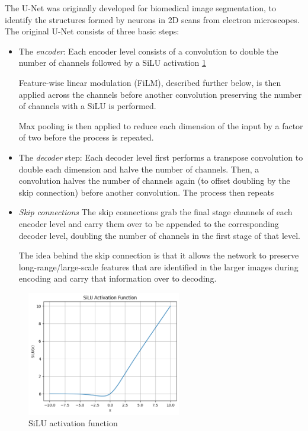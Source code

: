 \documentclass[12pt]{article}
\begin{document}
The U-Net was originally developed for biomedical image segmentation, to identify the structures formed by neurons in 
2D scans from electron microscopes. The original U-Net consists of three basic steps:

\begin{itemize}
	\item The \textit{encoder}: Each encoder level consists of a convolution to double the number of channels followed
	by a SiLU activation \ref{fig:silu}
	
	Feature-wise linear modulation (FiLM), described further below, is then applied
	across the channels before another convolution preserving the number of channels with a SiLU is performed.
	
	Max pooling is then applied to reduce each dimension of the input by a factor of two before the process is repeated.

	\item The \textit{decoder} step: Each decoder level first performs a transpose convolution to double each dimension and halve 
	the number of channels.
	Then, a convolution halves the number of channels again (to offset doubling by the skip connection) before another convolution. The process then repeats

	\item \textit{Skip connections} The skip connections grab the final stage channels of each encoder level and carry them over
	to be appended to the corresponding decoder level, doubling the number of channels in the first stage of that level.

	The idea behind the skip connection is that it allows the network to preserve long-range/large-scale features that are identified
	in the larger images during encoding and carry that information over to decoding. 
\end{itemize}

\begin{figure}
	\begin{center}
	\includegraphics[width=0.6\textwidth]{figures/SiLU.png}
	\end{center}
	\caption[SiLU Activation]{SiLU activation function}
	\label{fig:silu}
\end{figure}
\end{document}
